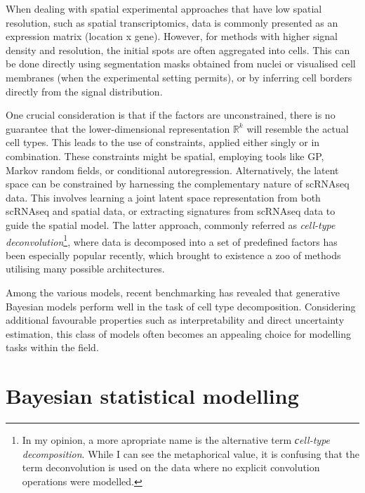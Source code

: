 When dealing with spatial experimental approaches that have low spatial resolution, such as spatial transcriptomics, data is commonly presented as an expression matrix (location x gene). However, for methods with higher signal density and resolution, the initial spots are often aggregated into cells. This can be done directly using segmentation masks obtained from nuclei or visualised cell membranes (when the experimental setting permits), or by inferring cell borders directly from the signal distribution.

One crucial consideration is that if the factors are unconstrained, there is no guarantee that the lower-dimensional representation  $\mathbb{R}^k$ will resemble the actual cell types. This leads to the use of constraints, applied either singly or in combination. These constraints might be spatial, employing tools like \ac{GP}, Markov random fields, or conditional autoregression. Alternatively, the latent space can be constrained by harnessing the complementary nature of \ac{scRNAseq} data. This involves learning a joint latent space representation from both scRNAseq and spatial data, or extracting signatures from \ac{scRNAseq} data to guide the spatial model. The latter approach, commonly referred as \emph{cell-type deconvolution}\footnote{In my opinion, a more apropriate name is the alternative term \emph{сell-type decomposition}. While I can see the metaphorical value, it is confusing that the term deconvolution is used on the data where no explicit convolution operations were modelled.}, where data is decomposed into a set of predefined factors has been especially popular recently, which brought to existence a zoo of methods utilising many possible architectures.

Among the various models, recent benchmarking has revealed that generative Bayesian models perform well in the task of cell type decomposition. Considering additional favourable properties such as interpretability and direct uncertainty estimation, this class of models often becomes an appealing choice for modelling tasks within the field.

\section{Bayesian statistical modelling}
\label{sec:bayesian-intro}

